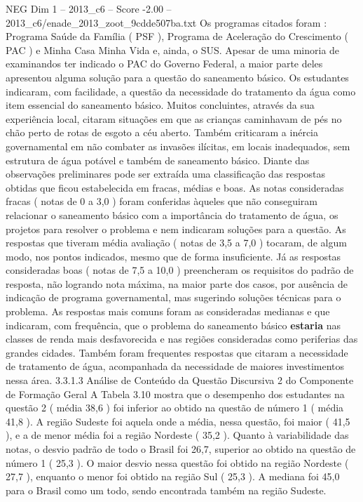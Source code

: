 \begin{textsample}{NEG Dim 1 – 2013\_c6 – Score -2.00 – 2013\_c6/enade\_2013\_zoot\_9cdde507ba.txt}
Os programas citados foram : Programa Saúde da Família ( PSF ), Programa de Aceleração do Crescimento ( PAC ) e Minha Casa Minha Vida e, ainda, o SUS.
Apesar de uma minoria de examinandos ter indicado o PAC do Governo Federal, a maior parte deles apresentou alguma solução para a questão do saneamento básico.
Os estudantes indicaram, com facilidade, a questão da necessidade do tratamento da água como item essencial do saneamento básico.
Muitos concluintes, através da sua experiência local, citaram situações em que as crianças caminhavam de pés no chão perto de rotas de esgoto a céu aberto.
Também criticaram a inércia governamental em não combater as invasões ilícitas, em locais inadequados, sem estrutura de água potável e também de saneamento básico.
Diante das observações preliminares pode ser extraída uma classificação das respostas obtidas que ficou estabelecida em fracas, médias e boas.
As notas consideradas fracas ( notas de 0 a 3,0 ) foram conferidas àqueles que não conseguiram relacionar o saneamento básico com a importância do tratamento de água, os projetos para resolver o problema e nem indicaram soluções para a questão.
As respostas que tiveram média avaliação ( notas de 3,5 a 7,0 ) tocaram, de algum modo, nos pontos indicados, mesmo que de forma insuficiente.
Já as respostas consideradas boas ( notas de 7,5 a 10,0 ) preencheram os requisitos do padrão de resposta, não logrando nota máxima, na maior parte dos casos, por ausência de indicação de programa governamental, mas sugerindo soluções técnicas para o problema.
As respostas mais comuns foram as consideradas medianas e que indicaram, com frequência, que o problema do saneamento básico \textbf{estaria} nas classes de renda mais desfavorecida e nas regiões consideradas como periferias das grandes cidades.
Também foram frequentes respostas que citaram a necessidade de tratamento de água, acompanhada da necessidade de maiores investimentos nessa área. 3.3.1.3 Análise de Conteúdo da Questão Discursiva 2 do Componente de Formação Geral A Tabela 3.10 mostra que o desempenho dos estudantes na questão 2 ( média 38,6 ) foi inferior ao obtido na questão de número 1 ( média 41,8 ).
A região Sudeste foi aquela onde a média, nessa questão, foi maior ( 41,5 ), e a de menor média foi a região Nordeste ( 35,2 ).
Quanto à variabilidade das notas, o desvio padrão de todo o Brasil foi 26,7, superior ao obtido na questão de número 1 ( 25,3 ).
O maior desvio nessa questão foi obtido na região Nordeste ( 27,7 ), enquanto o menor foi obtido na região Sul ( 25,3 ).
A mediana foi 45,0 para o Brasil como um todo, sendo encontrada também na região Sudeste.

\end{textsample}
